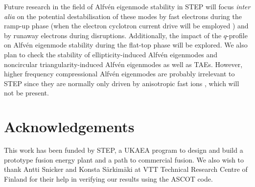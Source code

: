 \documentclass[10pt, a4paper, twoside]{article}
\begin{document}
Future research in the field of Alfv\'en eigenmode stability in STEP will focus {\it inter alia} on the potential destabilisation of these modes by fast electrons during the ramp-up phase (when the electron cyclotron current drive will be employed \cite{Henderson2024}) and by runaway electrons during disruptions. Additionally, the impact of the $q$-profile on Alfv\'en eigenmode stability during the flat-top phase will be explored. We also plan to check the stability of ellipticity-induced Alfv\'en eigenmodes and noncircular triangularity-induced Alfv\'en eigenmodes as well as TAEs. However, higher frequency compressional Alfv\'en eigenmodes are probably irrelevant to STEP since they are normally only driven by anisotropic fast ions \cite{Gorelenkov2016}, which will not be present. 




\section*{Acknowledgements}

This work has been funded by STEP, a UKAEA program to design and build a prototype fusion energy plant and a path to commercial fusion. We also wish to thank Antti Snicker and Konsta S\"arkim\"aki at VTT Technical Research Centre of Finland for their help in verifying our results using the ASCOT code.
\end{document}
